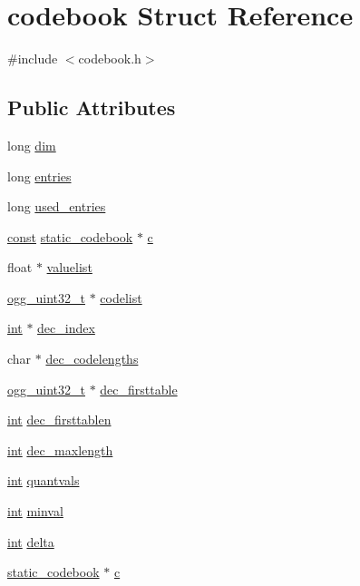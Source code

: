 \hypertarget{structcodebook}{}\section{codebook Struct Reference}
\label{structcodebook}


{\ttfamily \#include $<$codebook.\+h$>$}

\subsection*{Public Attributes}
\begin{DoxyCompactItemize}
\item 
long \hyperlink{structcodebook_a686979784ac16e673f22201ed3c4a155}{dim}
\item 
long \hyperlink{structcodebook_ad025d4a6ebb7417a99870380bfbd1a66}{entries}
\item 
long \hyperlink{structcodebook_a4ab1a61278a77046c0a213b7ddfe748c}{used\+\_\+entries}
\item 
\hyperlink{getopt1_8c_a2c212835823e3c54a8ab6d95c652660e}{const} \hyperlink{structstatic__codebook}{static\+\_\+codebook} $\ast$ \hyperlink{structcodebook_ad3f2dd8f3ad3efffbb5f60d467133ab0}{c}
\item 
float $\ast$ \hyperlink{structcodebook_ac3365da931532e158435f2e62021c90b}{valuelist}
\item 
\hyperlink{config__types_8h_a1497f30ea347d4dd0541e0289405865b}{ogg\+\_\+uint32\+\_\+t} $\ast$ \hyperlink{structcodebook_a2ea951b8092a4a68551bbd9728fc86af}{codelist}
\item 
\hyperlink{xmltok_8h_a5a0d4a5641ce434f1d23533f2b2e6653}{int} $\ast$ \hyperlink{structcodebook_a25d9abb79519e5740fae3c635bff7031}{dec\+\_\+index}
\item 
char $\ast$ \hyperlink{structcodebook_aad33e74f39a1b209834804a8d28031c2}{dec\+\_\+codelengths}
\item 
\hyperlink{config__types_8h_a1497f30ea347d4dd0541e0289405865b}{ogg\+\_\+uint32\+\_\+t} $\ast$ \hyperlink{structcodebook_a037eee9db5ac27e82c3be1a3e24ffebd}{dec\+\_\+firsttable}
\item 
\hyperlink{xmltok_8h_a5a0d4a5641ce434f1d23533f2b2e6653}{int} \hyperlink{structcodebook_ab3661a7669c853181bf70ca9296649c1}{dec\+\_\+firsttablen}
\item 
\hyperlink{xmltok_8h_a5a0d4a5641ce434f1d23533f2b2e6653}{int} \hyperlink{structcodebook_a53d70c4645254078f75ddd0420ce8e52}{dec\+\_\+maxlength}
\item 
\hyperlink{xmltok_8h_a5a0d4a5641ce434f1d23533f2b2e6653}{int} \hyperlink{structcodebook_a02612403c90ae6b2044d926db9764c8a}{quantvals}
\item 
\hyperlink{xmltok_8h_a5a0d4a5641ce434f1d23533f2b2e6653}{int} \hyperlink{structcodebook_af5e852ab410920fe29bcaae8552cd491}{minval}
\item 
\hyperlink{xmltok_8h_a5a0d4a5641ce434f1d23533f2b2e6653}{int} \hyperlink{structcodebook_aad494f73f5a9601fa1487bc6273a9c51}{delta}
\item 
\hyperlink{structstatic__codebook}{static\+\_\+codebook} $\ast$ \hyperlink{structcodebook_a5fa8f287f190d6cffc282dbe3449c60c}{c}
\end{DoxyCompactItemize}



